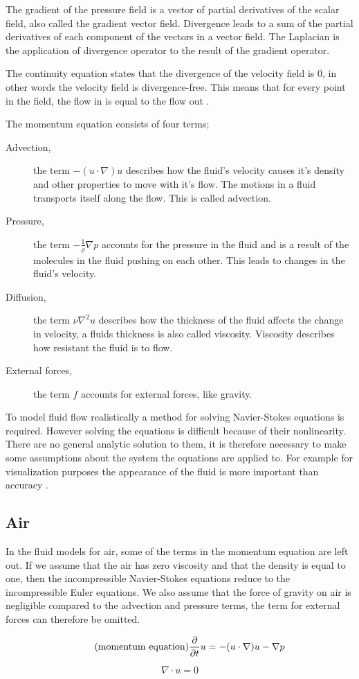 The gradient of the pressure field is a vector of partial derivatives of the 
scalar field, also called the gradient vector field. Divergence leads to a sum of 
the partial derivatives of each component of the vectors in a vector field. The 
Laplacian is the application of divergence operator to the result of the gradient 
operator. 

The continuity equation states that the divergence of the 
velocity field is 0, in other words the velocity field is divergence-free. This 
means that for every point in the field, the flow in is equal to the flow out
\cite{originalSnowThesis}. 

The momentum equation consists of four terms;
\begin{description}
	\item[Advection,] the term $-(u \cdot \nabla)u$ describes how the fluid's 
	velocity causes it's density and other properties to move with it's flow. 
	The motions in a fluid transports itself along the flow. This is called 
	advection. 
	\item[Pressure,] the term $-\frac{1}{\rho}\nabla p$ accounts for the pressure 
	in the fluid and is a result of the molecules in the fluid pushing on each 
	other. This leads to changes in the fluid's velocity. 
	\item[Diffusion,] the term $\nu \nabla^2 u$ describes how the thickness of the 
	fluid affects the change in velocity, a fluids thickness is also called viscosity. 
	Viscosity describes how resistant the fluid is to flow. 
	\item[External forces,] the term $f$ accounts for external forces, like gravity.
\end{description}

To model fluid flow realistically a method for solving Navier-Stokes equations is 
required. However solving the equations is difficult because of their nonlinearity. 
There are no general analytic solution to them, it is therefore necessary to make 
some assumptions about the system the equations are applied to. For example for 
visualization purposes the appearance of the fluid is more important than accuracy 
\cite{smokeAndFire}. 

\subsection{Air}

In the fluid models for air, some of the terms in the momentum equation are left 
out. If we assume that the air has zero viscosity and that the density is equal 
to one, then the incompressible Navier-Stokes equations reduce to the incompressible 
Euler equations. We also assume that the force of gravity on air is negligible 
compared to the advection and pressure terms, the term for external forces can 
therefore be omitted\cite{originalSnowThesis}. 

\begin{equation} 
	\tag{momentum equation}
	\frac{\partial}{\partial t}u  = -(u \cdot \nabla)u - \nabla p
\end{equation}

\begin{equation}
	\tag{continuity equation}
	\nabla \cdot u = 0
\end{equation}
